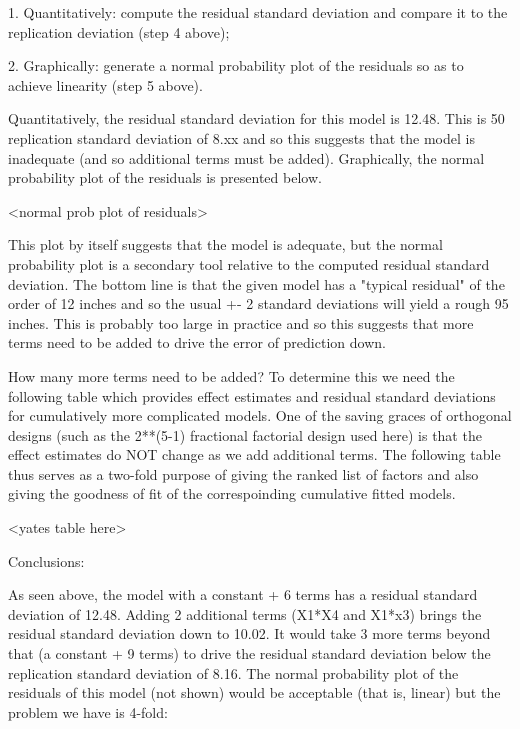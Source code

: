       1. Quantitatively: compute the residual standard
                         deviation and compare it to the
                         replication deviation (step 4 above);

      2. Graphically:    generate a normal probability plot
                         of the residuals so as to achieve
                         linearity (step 5 above).

   Quantitatively, the residual standard deviation for
   this model is 12.48.  This is 50%
   replication standard deviation of 8.xx and so this
   suggests that the model is inadequate (and so
   additional terms must be added).  Graphically, the
   normal probability plot of the residuals is
   presented below.

      <normal prob plot of residuals>

   This plot by itself suggests that the model is
   adequate, but the normal probability plot is a
   secondary tool relative to the computed residual
   standard deviation.  The bottom line is that the
   given model has a "typical residual" of the order of
   12 inches and so the usual +- 2 standard deviations
   will yield a rough 95%
   inches.  This is probably too large in practice and
   so this suggests that more terms need to be added to
   drive the error of prediction down.

   How many more terms need to be added?  To determine
   this we need the following table which provides
   effect estimates and residual standard deviations
   for cumulatively more complicated models.  One of
   the saving graces of orthogonal designs (such as the
   2**(5-1) fractional factorial design used here) is
   that the effect estimates do NOT change as we add
   additional terms.  The following table thus serves
   as a two-fold purpose of giving the ranked list of
   factors and also giving the goodness of fit of the
   correspoinding cumulative fitted models.

      <yates table here>

Conclusions:

As seen above, the model with a constant + 6 terms has
a residual standard deviation of 12.48.  Adding 2
additional terms (X1*X4 and X1*x3) brings the residual
standard deviation down to 10.02.  It would take 3 more
terms beyond that (a constant + 9 terms) to drive the
residual standard deviation below the replication
standard deviation of 8.16.  The normal probability
plot of the residuals of this model (not shown) would
be acceptable (that is, linear) but the problem we have
is 4-fold:


